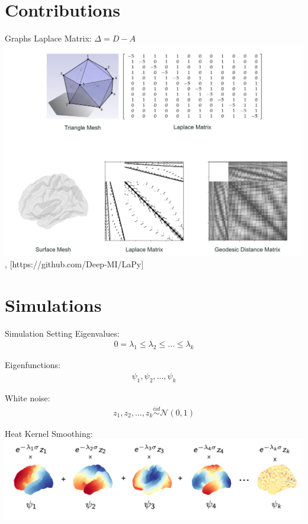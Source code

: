 \documentclass[8pt]{beamer}
\begin{document}
\section{Contributions}

\begin{frame}{Graphs}
Laplace Matrix: $\Delta = D - A$
\includegraphics[width=1\textwidth]{project/figures/graphs.png}   
\citep{reuter_laplacebeltrami_2006}, [https://github.com/Deep-MI/LaPy]
\end{frame}

\section{Simulations}

\begin{frame}{Simulation Setting}
Eigenvalues:
\begin{align*}
    0 = \lambda_1 \le \lambda_2 \le \dots \le \lambda_k \tag{from 2}
\end{align*}

Eigenfunctions:
\begin{align*}
   \psi_1, \psi_2, \dots, \psi_k \tag{from 2}
\end{align*}

White noise:
\begin{align*}
    z_1, z_2, \dots, z_k \overset{iid}\sim \mathcal{N}(0, 1) \tag{from 5}
\end{align*}

\vspace{.25cm}
Heat Kernel Smoothing:
\includegraphics[width=1\textwidth]{project/figures/eigenfunctions.png}
\end{frame}
\end{document}

